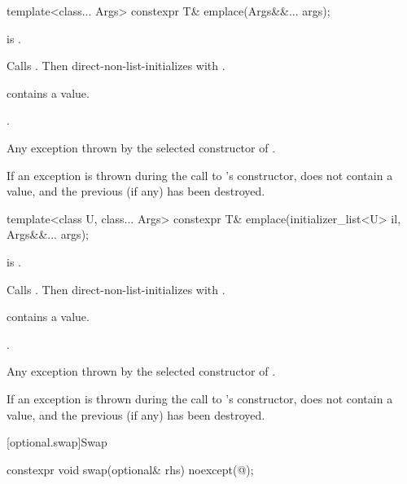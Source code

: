 %
\begin{itemdecl}
template<class... Args> constexpr T& emplace(Args&&... args);
\end{itemdecl}

\begin{itemdescr}
\pnum
\constraints
{} is .

\pnum
\effects
Calls . Then direct-non-list-initializes 
with .

\pnum
\ensures
{} contains a value.

\pnum
\returns
{}.

\pnum
\throws
Any exception thrown by the selected constructor of .

\pnum
\remarks
If an exception is thrown during the call to 's constructor,
 does not contain a value, and
the previous  (if any) has been destroyed.
\end{itemdescr}

%
\begin{itemdecl}
template<class U, class... Args> constexpr T& emplace(initializer_list<U> il, Args&&... args);
\end{itemdecl}

\begin{itemdescr}
\pnum
\constraints
{} is .

\pnum
\effects
Calls . Then direct-non-list-initializes  with
.

\pnum
\ensures
{} contains a value.

\pnum
\returns
{}.

\pnum
\throws
Any exception thrown by the selected constructor of .

\pnum
\remarks
If an exception is thrown during the call to 's constructor,
 does not contain a value, and
the previous  (if any) has been destroyed.
\end{itemdescr}

[optional.swap]{Swap}

%
\begin{itemdecl}
constexpr void swap(optional& rhs) noexcept(@\seebelow@);
\end{itemdecl}

